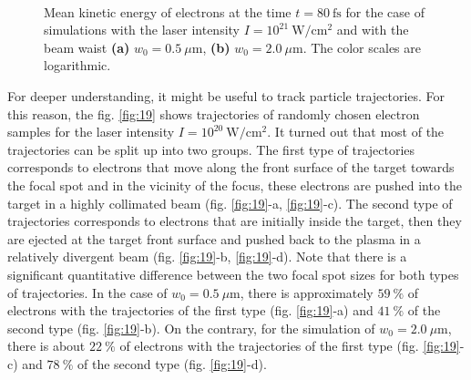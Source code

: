 \begin{figure}[h!]
	\centering
	\\[2mm]
	\caption{Mean kinetic energy of electrons at the time $ t = 80 \ \mathrm{fs} $ for the case of simulations with the laser intensity $ I = 10^{21} \ \mathrm{W/cm^2} $ and with the beam waist \textbf{(a)} $ w_0 = 0.5 \ \mu\mathrm{m} $, \textbf{(b)} $ w_0 = 2.0 \ \mu\mathrm{m} $. The color scales are logarithmic.}
	\label{fig:17}
\end{figure}

For deeper understanding, it might be useful to track particle trajectories. For this reason, the fig. \ref{fig:19} shows trajectories of randomly chosen electron samples for the laser intensity $ I = 10^{20} \ \mathrm{W/cm^2} $. It turned out that most of the trajectories can be split up into two groups. The first type of trajectories corresponds to electrons that move along the front surface of the target towards the focal spot and in the vicinity of the focus, these electrons are pushed into the target in a highly collimated beam (fig. \ref{fig:19}-a, \ref{fig:19}-c). The second type of trajectories corresponds to electrons that are initially inside the target, then they are ejected at the target front surface and pushed back to the plasma in a relatively divergent beam (fig. \ref{fig:19}-b, \ref{fig:19}-d). Note that there is a significant quantitative difference between the two focal spot sizes for both types of trajectories. In the case of $ w_0 = 0.5 \ \mu\mathrm{m} $, there is approximately $ 59 \ \% $ of electrons with the trajectories of the first type (fig. \ref{fig:19}-a) and $ 41 \ \% $ of the second type (fig. \ref{fig:19}-b). On the contrary, for the simulation of $ w_0 = 2.0 \ \mu\mathrm{m} $, there is about $ 22 \ \% $ of electrons with the trajectories of the first type (fig. \ref{fig:19}-c) and $ 78 \ \% $ of the second type (fig. \ref{fig:19}-d).

